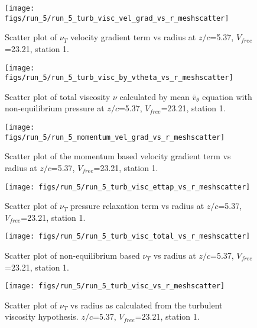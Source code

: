 \begin{figure}[H]
\centering
\texttt{[image: figs/run\_5/run\_5\_turb\_visc\_vel\_grad\_vs\_r\_meshscatter]}
\caption{Scatter plot of $\nu_T$ velocity gradient term vs radius at $z/c$=5.37, $V_{free}$=23.21, station 1.}
\end{figure}


\begin{figure}[H]
\centering
\texttt{[image: figs/run\_5/run\_5\_turb\_visc\_by\_vtheta\_vs\_r\_meshscatter]}
\caption{Scatter plot of total viscosity $\nu$ calculated by mean $\bar{v}_{\theta}$ equation with non-equilibrium pressure at $z/c$=5.37, $V_{free}$=23.21, station 1.}
\end{figure}


\begin{figure}[H]
\centering
\texttt{[image: figs/run\_5/run\_5\_momentum\_vel\_grad\_vs\_r\_meshscatter]}
\caption{Scatter plot of the momentum based velocity gradient term vs radius at $z/c$=5.37, $V_{free}$=23.21, station 1.}
\end{figure}


\begin{figure}[H]
\centering
\texttt{[image: figs/run\_5/run\_5\_turb\_visc\_ettap\_vs\_r\_meshscatter]}
\caption{Scatter plot of $\nu_T$ pressure relaxation term vs radius at $z/c$=5.37, $V_{free}$=23.21, station 1.}
\end{figure}


\begin{figure}[H]
\centering
\texttt{[image: figs/run\_5/run\_5\_turb\_visc\_total\_vs\_r\_meshscatter]}
\caption{Scatter plot of non-equilibrium based $\nu_T$ vs radius at $z/c$=5.37, $V_{free}$=23.21, station 1.}
\end{figure}


\begin{figure}[H]
\centering
\texttt{[image: figs/run\_5/run\_5\_turb\_visc\_vs\_r\_meshscatter]}
\caption{Scatter plot of $\nu_T$ vs radius as calculated from the turbulent viscosity hypothesis. $z/c$=5.37, $V_{free}$=23.21, station 1.}
\end{figure}


